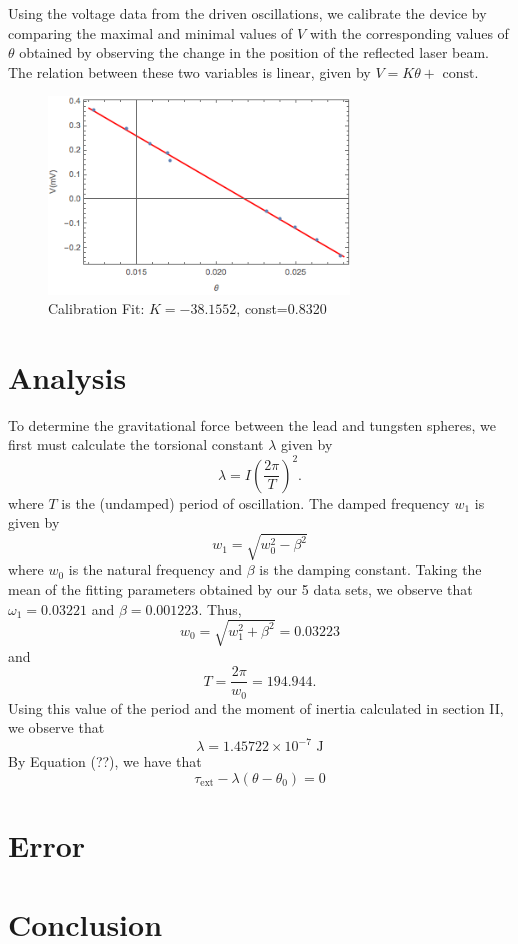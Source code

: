 \documentclass[aps, reprint,amsmath,amssymb]{revtex4-1} %
\begin{document}
Using the voltage data from the driven oscillations, we calibrate the device by comparing the maximal and minimal values of $V$ with the corresponding values of $\theta$ obtained by observing the change in the position of the reflected laser beam. The relation between these two variables is linear, given by $V = K \theta + \text{ const}$.

\begin{figure}[h!]
\centering
\caption{Calibration Fit: $K=-38.1552$, const=0.8320}
\includegraphics[width=8cm]{figs/calibration.png}
\end{figure} 

\section{Analysis}

To determine the gravitational force between the lead and tungsten spheres, we first must calculate the torsional constant $\lambda$ given by
$$
\lambda = I \left( \frac{2 \pi}{T} \right)^2.
$$
where $T$ is the (undamped) period of oscillation. The damped frequency $w_1$ is given by
$$
w_1 = \sqrt{w_0^2-\beta^2}
$$
where $w_0$ is the natural frequency and $\beta$ is the damping constant. Taking the mean of the fitting parameters obtained by our 5 data sets, we observe that $\omega_1 = 0.03221$ and $\beta = 0.001223$. Thus, 
$$
w_0 = \sqrt{w_1^2+\beta^2} = 0.03223
$$
and
$$
T = \frac{2\pi}{w_0} = 194.944.
$$
Using this value of the period and the moment of inertia calculated in section II, we observe that
$$
\lambda = 1.45722 \times 10^{-7} \text{ J}
$$
By Equation (??), we have that
$$
\tau_{\text{ext}} - \lambda(\theta - \theta_0) = 0
$$

\section{Error}

\section{Conclusion}
\end{document}
